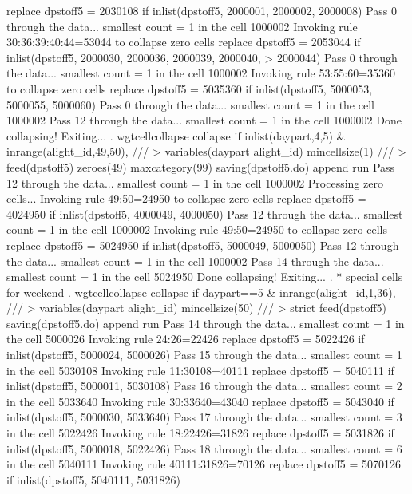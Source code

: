   replace dpstoff5 = 2030108 if inlist(dpstoff5, 2000001, 2000002, 2000008)
Pass 0 through the data...
  smallest count = 1 in the cell      1000002
  Invoking rule 30:36:39:40:44=53044 to collapse zero cells
  replace dpstoff5 = 2053044 if inlist(dpstoff5, 2000030, 2000036, 2000039, 2000040,
>  2000044)
\smallskip
\oom
\smallskip
Pass 0 through the data...
  smallest count = 1 in the cell      1000002
  Invoking rule 53:55:60=35360 to collapse zero cells
  replace dpstoff5 = 5035360 if inlist(dpstoff5, 5000053, 5000055, 5000060)
Pass 0 through the data...
  smallest count = 1 in the cell      1000002
Pass 12 through the data...
  smallest count = 1 in the cell      1000002
  Done collapsing! Exiting...
{\smallskip}
. wgtcellcollapse collapse if inlist(daypart,4,5) \& inrange(alight_id,49,50), ///
>         variables(daypart alight_id) mincellsize(1) ///
>         feed(dpstoff5) zeroes(49) maxcategory(99) saving(dpstoff5.do) append run
Pass 12 through the data...
  smallest count = 1 in the cell      1000002
{\smallskip}
Processing zero cells...
{\smallskip}
  Invoking rule 49:50=24950 to collapse zero cells
  replace dpstoff5 = 4024950 if inlist(dpstoff5, 4000049, 4000050)
Pass 12 through the data...
  smallest count = 1 in the cell      1000002
  Invoking rule 49:50=24950 to collapse zero cells
  replace dpstoff5 = 5024950 if inlist(dpstoff5, 5000049, 5000050)
Pass 12 through the data...
  smallest count = 1 in the cell      1000002
Pass 14 through the data...
  smallest count = 1 in the cell      5024950
  Done collapsing! Exiting...
{\smallskip}
. * special cells for weekend
. wgtcellcollapse collapse if daypart==5 \& inrange(alight_id,1,36), ///
>         variables(daypart alight_id) mincellsize(50) ///
>         strict feed(dpstoff5) saving(dpstoff5.do) append run
Pass 14 through the data...
  smallest count = 1 in the cell      5000026
  Invoking rule 24:26=22426
  replace dpstoff5 = 5022426 if inlist(dpstoff5, 5000024, 5000026)
Pass 15 through the data...
  smallest count = 1 in the cell      5030108
  Invoking rule 11:30108=40111
  replace dpstoff5 = 5040111 if inlist(dpstoff5, 5000011, 5030108)
Pass 16 through the data...
  smallest count = 2 in the cell      5033640
  Invoking rule 30:33640=43040
  replace dpstoff5 = 5043040 if inlist(dpstoff5, 5000030, 5033640)
Pass 17 through the data...
  smallest count = 3 in the cell      5022426
  Invoking rule 18:22426=31826
  replace dpstoff5 = 5031826 if inlist(dpstoff5, 5000018, 5022426)
Pass 18 through the data...
  smallest count = 6 in the cell      5040111
  Invoking rule 40111:31826=70126
  replace dpstoff5 = 5070126 if inlist(dpstoff5, 5040111, 5031826)
